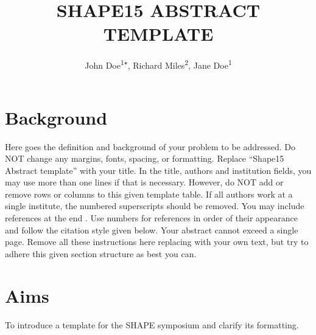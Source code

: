 \documentclass[DIV=calc, paper=a4, fontsize=10pt, twocolumn]{scrartcl}	 %
\title{\uppercase{
Shape15 Abstract template
}}
\author{
John Doe\textsuperscript{1$\star$},
Richard Miles\textsuperscript{2},
Jane Doe\textsuperscript{1}
}
\date{}
\begin{document}
\thispagestyle{empty}

\maketitle %



\section*{Background}

Here goes the definition and background of your problem to be addressed. 
Do NOT change any margins, fonts, spacing, or formatting. Replace ``Shape15 Abstract template'' with your title.
In the title, authors and institution fields, you may use more than one lines if that is necessary.  
However, do NOT add or remove rows or columns to this given template table. 
If all authors work at a single institute, the numbered superscripts should be removed. 
You may include references at the end \cite{Mayer24,Athos44}. 
Use numbers for references in order of their appearance and follow the citation style given below. 
Your abstract cannot exceed a single page.  
Remove all these instructions here replacing with your own text, but try to adhere this given section structure as best you can.


\section*{Aims}

To introduce a template for the SHAPE symposium and clarify its formatting.


\end{document}

